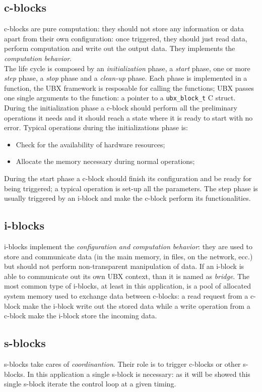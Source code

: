 \subsection{c-blocks}
c-blocks are pure computation: they should not store any information or data apart from their own configuration: once triggered, they should just read data, perform computation and write out the output data. They implements the \emph{computation behavior}.\\
The life cycle is composed by an \emph{initialization} phase, a \emph{start} phase, one or more \emph{step} phase, a \emph{stop} phase and a \emph{clean-up} phase. Each phase is implemented in a function, the UBX framework is resposable for calling the functions; UBX passes one single arguments to the function: a pointer to a \texttt{ubx\_block\_t} C struct.\\
During the initialization phase a c-block should perform all the preliminary operations it needs and it should reach a state where it is ready to start with no error. Typical operations during the initializations phase is:
\begin{itemize}
	\item Check for the availability of hardware resources;
	\item Allocate the memory necessary during normal operations;
\end{itemize}
During the start phase a c-block should finish its configuration and be ready for being triggered; a typical operation is set-up all the parameters.
The step phase is usually triggered by an i-block and make the c-block perform its functionalities.

\subsection{i-blocks}
i-blocks implement the \emph{configuration and computation behavior}: they are used to store and communicate data (in the main memory, in files, on the network, ecc.) but should not perform non-transparent manipulation of data. If an i-block is able to communicate out its own UBX context, than it is named as \emph{bridge}.
The most common type of i-blocks, at least in this application, is a pool of allocated system memory used to exchange data between c-blocks: a read request from a c-block make the i-block write out the stored data while a write operation from a c-block make the i-block store the incoming data.

\subsection{s-blocks}
s-blocks take cares of \emph{coordinantion}. Their role is to trigger c-blocks or other s-blocks. In this application a single s-block is necessary: as it will be showed this single s-block iterate the control loop at a given timing.


